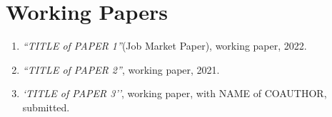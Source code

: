 
\section{Working Papers}
\vspace{-.25in}
\begin{enumerate}
	\item  \textit{``TITLE of PAPER 1''}(Job Market Paper), working paper, 2022.
	
	\item \textit{``TITLE of PAPER 2''}, working paper, 2021.

	\item  \textit{`TITLE of PAPER 3''}, working paper, with NAME of COAUTHOR, submitted.

	
\end{enumerate}   

